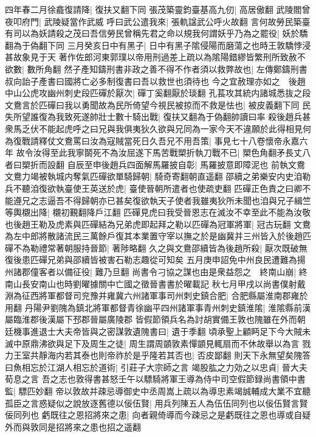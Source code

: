四年春二月徐龕復請降|{
	復扶又翻下同}
張茂築靈鈞臺基高九仞|{
	高居傲翻}
武陵閻曾夜叩府門|{
	武陵疑當作武威}
呼曰武公遣我來|{
	張軌諡武公呼火故翻}
言何故勞民築臺有司以為妖請殺之茂曰吾信勞民曾稱先君之命以規我何謂妖乎乃為之罷役|{
	妖於驕翻為于偽翻下同}
三月癸亥日中有黑子|{
	日中有黑子隂侵陽而磨蕩之也時王敦驕悖浸甚故象見于天}
著作佐郎河東郭璞以帝用刑過差上疏以為隂陽錯繆皆繁刑所致赦不欲數|{
	數所角翻}
然子產知鑄刑書非政之善不得不作者須以救弊故也|{
	左傳鄭鑄刑書叔向詒子產書曰國將亡必多制復書曰吾以救世也須待也}
今之宜赦理亦如之　後趙中山公虎攻幽州刺史段匹磾於厭次|{
	磾丁奚翻厭於琰翻}
孔萇攻其統内諸城悉抜之段文鴦言於匹磾曰我以勇聞故為民所倚望今視民被掠而不救是怯也|{
	被皮義翻下同}
民失所望誰復為我致死遂帥壯士數十騎出戰|{
	復扶又翻為于偽翻帥讀曰率}
殺後趙兵甚衆馬乏伏不能起虎呼之曰兄與我俱夷狄久欲與兄同為一家今天不違願於此得相見何為復戰請釋仗文鴦罵曰汝為寇賊當死日久吾兄不用吾策|{
	事見七十八卷懷帝永嘉六年}
故令汝得至此我寧鬬死不為汝屈遂下馬苦戰槊折執刀戰不已|{
	槊色角翻矛長丈八者曰槊折而設翻}
自辰至申後趙兵四面解馬羅披自彰|{
	馬羅披意即障泥也}
前執文鴦文鴦力竭被執城内奪氣匹磾欲單騎歸朝|{
	騎奇寄翻朝直遥翻}
邵續之弟樂安内史洎勒兵不聽洎復欲執臺使王英送於虎|{
	臺使晉朝所遣者也使疏吏翻}
匹磾正色責之曰卿不能遵兄之志逼吾不得歸朝亦已甚矣復欲執天子使者我雖夷狄所未聞也洎與兄子緝竺等輿櫬出降|{
	櫬初覲翻降戶江翻}
匹磾見虎曰我受晉恩志在滅汝不幸至此不能為汝敬也後趙王勒及虎素與匹磾結為兄弟虎即起拜之勒以匹磾為冠軍將軍|{
	冠古玩翻}
文鴦為左中郎將散諸流民三萬餘戶復其本業置守宰以撫之於是幽冀并三州皆入於後趙匹磾不為勒禮常著朝服持晉節|{
	著陟略翻}
久之與文鴦邵續皆為後趙所殺|{
	厭次既破無復後患匹磾兄弟與邵續皆被害石勒志趣從可知矣}
五月庚申詔免中州良民遭難為揚州諸郡僮客者以備征役|{
	難乃旦翻}
尚書令刁協之謀也由是衆益怨之　終南山崩|{
	終南山長安南山也時劉曜據關中亡國之徵晉書書於曜載記}
秋七月甲戌以尚書僕射戴淵為征西將軍都督司兖豫并雍冀六州諸軍事司州刺史鎮合肥|{
	合肥縣屬淮南郡雍於用翻}
丹陽尹劉隗為鎮北將軍都督青徐幽平四州諸軍事青州刺史鎮淮隂|{
	淮隂縣前漢屬臨淮郡後漢屬下邳郡晉屬廣陵郡}
皆假節領兵名為討胡實備王敦也隗雖在外而朝廷機事進退士大夫帝皆與之密謀敦遺隗書曰|{
	遺于季翻}
頃承聖上顧眄足下今大賊未滅中原鼎沸欲與足下及周生之徒|{
	周生謂周顗敦素憚顗見輒扇而不休故舉以為言}
戮力王室共靜海内若其泰也則帝祚於是乎隆若其否也|{
	否皮鄙翻}
則天下永無望矣隗答曰魚相忘於江湖人相忘於道術|{
	引莊子大宗師之言}
竭股肱之力効之以忠貞|{
	晉大夫荀息之言}
吾之志也敦得書甚怒壬午以驃騎將軍王導為侍中司空假節録尚書領中書監|{
	驃匹妙翻}
帝以敦故并疎忌導御史中丞周嵩上疏以為導忠素竭誠輔成大業不宜聽孤臣之言惑疑似之說放逐舊德以佞伍賢|{
	用兵列陳五人為伍伍同列也以佞伍賢言賢佞同列也}
虧既往之恩招將來之患|{
	向者親倚導而今疎忌之是虧既往之恩也導或自疑外而與敦同是招將來之患也招之遥翻}

